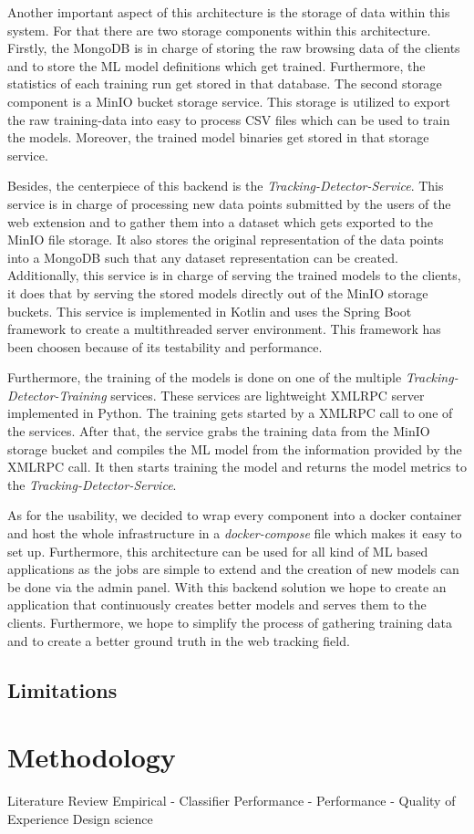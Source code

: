 Another important aspect of this architecture is the storage of data within this system. For that there are two storage components within this
architecture. Firstly, the MongoDB is in charge of storing the raw browsing data of the clients and to store the ML model definitions which get 
trained. Furthermore, the statistics of each training run get stored in that database. The second storage component is a MinIO bucket storage service.
This storage is utilized to export the raw training-data into easy to process CSV files which can be used to train the models. Moreover, the trained model
binaries get stored in that storage service.

Besides, the centerpiece of this backend is the \emph{Tracking-Detector-Service}. This service is in charge of processing new data points 
submitted by the users of the web extension and to gather them into a dataset which gets exported to the MinIO file storage. It also stores 
the original representation of the data points into a MongoDB such that any dataset representation can be created. Additionally, this service
is in charge of serving the trained models to the clients, it does that by serving the stored models directly out of the MinIO storage buckets.
This service is implemented in Kotlin and uses the Spring Boot framework to create a multithreaded server environment. This framework has been choosen
because of its testability and performance.

Furthermore, the training of the models is done on one of the multiple \emph{Tracking-Detector-Training} services. These services are
lightweight XMLRPC server implemented in Python. The training gets started by a XMLRPC call to one of the services. After that, the service
grabs the training data from the MinIO storage bucket and compiles the ML model from the information provided by the XMLRPC call. It then starts
training the model and returns the model metrics to the \emph{Tracking-Detector-Service}.

As for the usability, we decided to wrap every component into a docker container and host the whole infrastructure in a \emph{docker-compose}
file which makes it easy to set up. Furthermore, this architecture can be used for all kind of ML based applications as the jobs are simple to extend 
and the creation of new models can be done via the admin panel. With this backend solution we hope to create an application that continuously creates
better models and serves them to the clients. Furthermore, we hope to simplify the process of gathering training data and to create a better
ground truth in the web tracking field.




\subsection{Limitations}

\section{Methodology}
Literature Review
Empirical
- Classifier Performance
- Performance
- Quality of Experience
Design science






